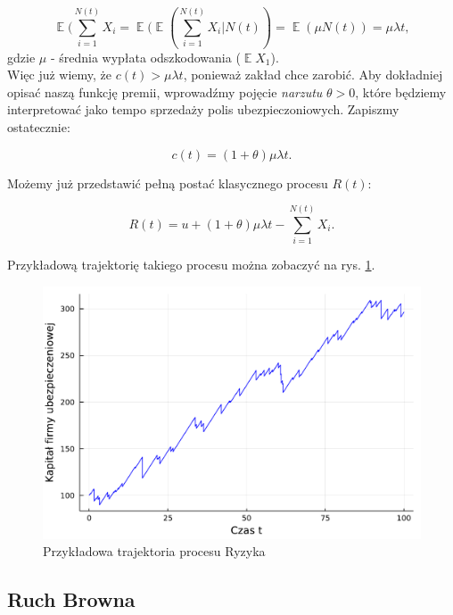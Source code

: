 \documentclass{article}
\theoremstyle{break}
\DeclareMathOperator{\EX}{\mathbb{E}}
\numberwithin{equation}{subsection}
\numberwithin{figure}{section}
\begin{document}
\begin{equation}
\EX(\sum_{i=1}^{N(t)}X_i = \EX(\EX(\sum_{i=1}^{N(t)}X_i | N(t)) = \EX(\mu N(t)) = \mu \lambda t,
\end{equation}
gdzie $\mu$ - średnia wypłata odszkodowania ($\EX X_1$).\\
Więc już wiemy, że $c(t) >  \mu \lambda t$, ponieważ zakład chce zarobić. Aby dokładniej opisać naszą funkcję premii, wprowadźmy pojęcie \emph{narzutu} $\theta >0$, które będziemy interpretować jako tempo sprzedaży polis ubezpieczoniowych. Zapiszmy ostatecznie:

\begin{equation}
c(t) = (1+\theta)\mu \lambda t.
\end{equation}

Możemy już przedstawić pełną postać klasycznego procesu $R(t)$:

\begin{equation}
R(t) = u +  (1+\theta)\mu \lambda t- \sum_{i=1}^{N(t)}X_i.
\end{equation}

Przykładową trajektorię takiego procesu można zobaczyć na rys. \ref{fig: 3}.
 
\begin{figure}
	\center
	\includegraphics[scale=0.35]{trajektoria_ryzyka.pdf}
	\caption{Przykładowa trajektoria procesu Ryzyka}
	\label{fig: 3}
\end{figure}

\subsection{Ruch Browna}
\end{document}
